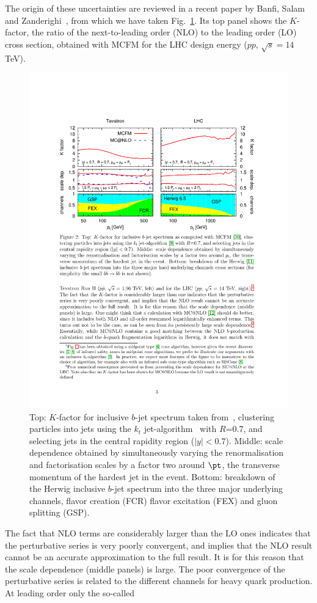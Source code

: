 The origin of these uncertainties are reviewed in a recent paper by Banfi, Salam and Zanderighi~\cite{Salam.AccurateHQ}, from which we have taken Fig.~\ref{fig:bjets_qcd}. Its top panel shows the $K$-factor, the ratio of the next-to-leading order (NLO) to the leading order (LO) cross section, obtained with MCFM for the LHC design energy  ($pp$, $\sqrt{s}= 14$ TeV).
\begin{figure}[tp]
\centering
\includegraphics[height=0.7\textwidth,viewport=300 410 530 690,clip]{FIGS/bjets_qcd.pdf}
  \caption{Top: $K$-factor for inclusive $b$-jet spectrum taken
  from~\cite{Salam.AccurateHQ}, clustering particles into jets using the $k_t$
  jet-algorithm~\cite{kt1}  with $R$=0.7, and selecting jets in the central
  rapidity region ($|y| <0.7$). Middle: scale dependence obtained by
  simultaneously varying the renormalisation and factorisation scales by a factor
  two around $\pt$, the transverse momentum of the hardest jet in the event.
  Bottom: breakdown of the Herwig \cite{Herwig} inclusive $b$-jet spectrum into
  the three major underlying channels, flavor creation (FCR) flavor excitation
  (FEX) and gluon splitting (GSP).}
  \label{fig:bjets_qcd}
\end{figure}
The fact that NLO terms are considerably larger than the LO ones indicates
that the perturbative series is very poorly convergent, and implies that the
NLO result cannot be an accurate approximation to the full result.
It is for this reason that the scale dependence (middle panels) is large.  The
poor convergence of the perturbative series is related to the different
channels for heavy quark production. At leading order only the so-called
